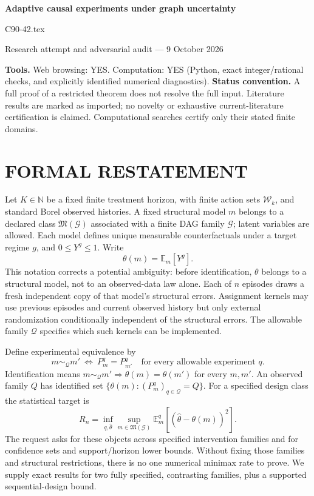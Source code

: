 \documentclass[11pt,a4paper]{article}
\theoremstyle{remark}\newtheorem{remark}[theorem]{Remark}
\newcommand{\N}{\mathbb N}
\newcommand{\E}{\mathbb E}
\begin{document}
\begin{center}
{\LARGE\bfseries Adaptive causal experiments under graph uncertainty}\par\medskip
{\large C90-42.tex}\par
Research attempt and adversarial audit --- 9 October 2026
\end{center}
\label{problem:OP-0480}
\label{beyond:CI-01}
\textbf{Tools.} Web browsing: YES. Computation: YES (Python, exact integer/rational checks, and explicitly identified numerical diagnostics).
\textbf{Status convention.} A full proof of a restricted theorem does not resolve the full input. Literature results are marked as imported; no novelty or exhaustive current-literature certification is claimed. Computational searches certify only their stated finite domains.

\section{FORMAL RESTATEMENT}
Let $K\in\N$ be a fixed finite treatment horizon, with finite action sets $\mathcal W_k$, and standard Borel observed histories. A fixed structural model $m$ belongs to a declared class $\mathfrak M(\mathcal G)$ associated with a finite DAG family $\mathcal G$; latent variables are allowed. Each model defines unique measurable counterfactuals under a target regime $g$, and $0\le Y^g\le1$. Write
\[
\theta(m)=\E_m[Y^g].
\]
This notation corrects a potential ambiguity: before identification, $\theta$ belongs to a structural model, not to an observed-data law alone. Each of $n$ episodes draws a fresh independent copy of that model's structural errors. Assignment kernels may use previous episodes and current observed history but only external randomization conditionally independent of the structural errors. The allowable family $\mathcal Q$ specifies which such kernels can be implemented.

Define experimental equivalence by
\[
m\sim_{\mathcal Q}m'\ \Longleftrightarrow\ P_m^q=P_{m'}^q\quad\text{for every allowable experiment }q.
\]
Identification means $m\sim_{\mathcal Q}m'\Rightarrow\theta(m)=\theta(m')$ for every $m,m'$. An observed family $Q$ has identified set $\{\theta(m):(P_m^q)_{q\in\mathcal Q}=Q\}$. For a specified design class the statistical target is
\[
R_n=\inf_{q,\widehat\theta}\sup_{m\in\mathfrak M(\mathcal G)}
\E_m^q[(\widehat\theta-\theta(m))^2].
\]
The request asks for these objects across specified intervention families and for confidence sets and support/horizon lower bounds. Without fixing those families and structural restrictions, there is no one numerical minimax rate to prove. We supply exact results for two fully specified, contrasting families, plus a supported sequential-design bound.
\end{document}
